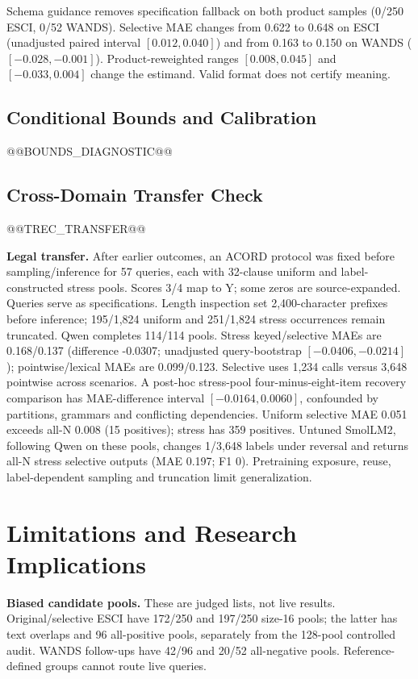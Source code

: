 \documentclass[conference]{IEEEtran}
\begin{document}
Schema guidance removes specification fallback on both product samples (0/250 ESCI, 0/52 WANDS). Selective MAE changes from 0.622 to 0.648 on ESCI (unadjusted paired interval $[0.012,0.040]$) and from 0.163 to 0.150 on WANDS ($[-0.028,-0.001]$). Product-reweighted ranges $[0.008,0.045]$ and $[-0.033,0.004]$ change the estimand. Valid format does not certify meaning.

\subsection{Conditional Bounds and Calibration}
@@BOUNDS_DIAGNOSTIC@@

\subsection{Cross-Domain Transfer Check}
@@TREC_TRANSFER@@


\textbf{Legal transfer.} After earlier outcomes, an ACORD protocol \cite{acord} was fixed before sampling/inference for 57 queries, each with 32-clause uniform and label-constructed stress pools. Scores 3/4 map to Y; some zeros are source-expanded. Queries serve as specifications. Length inspection set 2,400-character prefixes before inference; 195/1,824 uniform and 251/1,824 stress occurrences remain truncated. Qwen completes 114/114 pools. Stress keyed/selective MAEs are 0.168/0.137 (difference -0.0307; unadjusted query-bootstrap $[-0.0406,-0.0214]$); pointwise/lexical MAEs are 0.099/0.123. Selective uses 1,234 calls versus 3,648 pointwise across scenarios. A post-hoc stress-pool four-minus-eight-item recovery comparison has MAE-difference interval $[-0.0164,0.0060]$, confounded by partitions, grammars and conflicting dependencies. Uniform selective MAE 0.051 exceeds all-N 0.008 (15 positives); stress has 359 positives. Untuned SmolLM2, following Qwen on these pools, changes 1/3,648 labels under reversal and returns all-N stress selective outputs (MAE 0.197; F1 0). Pretraining exposure, reuse, label-dependent sampling and truncation limit generalization.

\section{Limitations and Research Implications}
\textbf{Biased candidate pools.} These are judged lists, not live results. Original/selective ESCI have 172/250 and 197/250 size-16 pools; the latter has text overlaps and 96 all-positive pools, separately from the 128-pool controlled audit. WANDS follow-ups have 42/96 and 20/52 all-negative pools. Reference-defined groups cannot route live queries.
\end{document}
